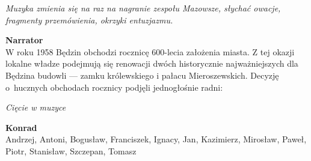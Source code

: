 \documentclass[11pt,a4paper,oneside]{article}
\begin{document}
{\color{light-gray} \emph{Muzyka zmienia się na raz na nagranie
zespołu Mazowsze, słychać owacje, fragmenty przemówienia, okrzyki
entuzjazmu.}}

\textbf{Narrator}\\
W roku 1958 Będzin obchodzi rocznicę 600-lecia założenia miasta.
Z tej okazji lokalne władze podejmują się renowacji dwóch historycznie
najważniejszych dla Będzina budowli --- zamku królewskiego i pałacu
Mieroszewskich. Decyzję o~hucznych obchodach rocznicy podjęli
jednogłośnie radni:

{\color{light-gray} \emph{Cięcie w muzyce}}

{\color{konrad}
\textbf{Konrad}\\
Andrzej, Antoni, Bogusław, Franciszek, Ignacy, Jan, Kazimierz, Mirosław, 
Paweł, Piotr, Stanisław, Szczepan, Tomasz
}
\end{document}
